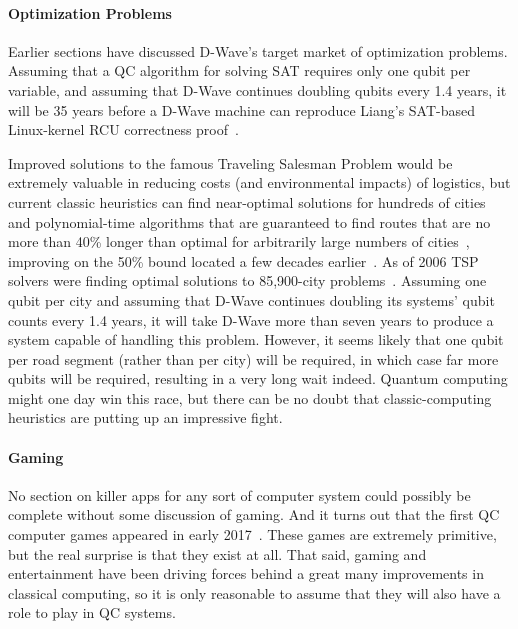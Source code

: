 \paragraph{Optimization Problems}
\label{sec:future:Optimization Problems}

Earlier sections have discussed D-Wave's target market of optimization
problems.
Assuming that a QC algorithm for solving SAT requires only one qubit
per variable, and assuming that D-Wave continues doubling qubits every
1.4 years, it will be 35 years before a D-Wave machine can reproduce
Liang's SAT-based Linux-kernel RCU correctness
proof~\cite{LihaoLiang2016VerifyTreeRCU}.

Improved solutions to the famous Traveling Salesman Problem would
be extremely valuable in reducing costs (and environmental impacts)
of logistics, but current classic heuristics can find near-optimal
solutions for hundreds of cities~\cite{Martin:1992:LMC:2307953.2308141}
and polynomial-time algorithms that are guaranteed to find routes
that are no more than 40\% longer than optimal for arbitrarily
large numbers of cities~\cite{Sebo:2014:STN:2688265.2688281},
improving on the 50\% bound located a few decades
earlier~\cite{NicosChristofides1976TSP-FiftyPercent}.
As of 2006 TSP solvers were finding optimal solutions to
85,900-city problems~\cite{DLApplegate2007TSPtextbook}.
Assuming one qubit per city and assuming that D-Wave continues doubling
its systems' qubit counts every 1.4 years, it will take D-Wave more than seven
years to produce a system capable of handling this problem.
However, it seems likely that one qubit per road segment (rather than per city)
will be required, in which case far more qubits will be required,
resulting in a very long wait indeed.
Quantum computing might one day win this race, but there can be no doubt that
classic-computing heuristics are putting up an impressive fight.

\paragraph{Gaming}
\label{sec:future:Gaming}

No section on killer apps for any sort of computer system could possibly
be complete without some discussion of gaming.
And it turns out that the first QC computer games appeared in early
2017~\cite{JamesWootton2017IBMQEgame,JamesWootton2017IBMQEbattleship}.
These games are extremely primitive, but the real surprise is that
they exist at all.
That said, gaming and entertainment have been driving forces
behind a great many improvements in classical computing, so it is
only reasonable to assume that they will also have a role to play
in QC systems.

